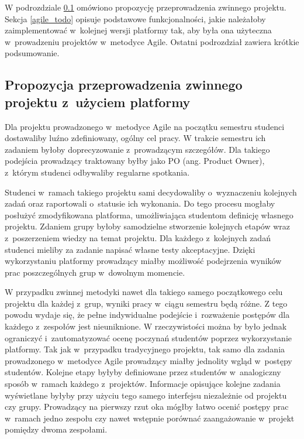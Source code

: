 W podrozdziale \ref{agile_proposition} omówiono propozycję przeprowadzenia zwinnego projektu.
Sekcja \ref{agile_todo} opisuje podstawowe funkcjonalności, jakie należałoby zaimplementować w~kolejnej wersji platformy tak, aby była ona użyteczna w~prowadzeniu projektów w~metodyce Agile.
Ostatni podrozdział zawiera krótkie podsumowanie.

\subsection{Propozycja przeprowadzenia zwinnego projektu z~użyciem platformy}
\label{agile_proposition}

Dla projektu prowadzonego w~metodyce Agile na początku semestru studenci dostawaliby luźno zdefiniowany, ogólny cel pracy.
W trakcie semestru ich zadaniem byłoby doprecyzowanie z~prowadzącym szczegółów.
Dla takiego podejścia prowadzący traktowany byłby jako PO (ang. Product Owner), z~którym studenci odbywaliby regularne spotkania.

Studenci w~ramach takiego projektu sami decydowaliby o~wyznaczeniu kolejnych zadań oraz raportowali o~statusie ich wykonania.
Do tego procesu mogłaby posłużyć zmodyfikowana platforma, umożliwiająca studentom definicję własnego projektu.
Zdaniem grupy byłoby samodzielne stworzenie kolejnych etapów wraz z~poszerzeniem wiedzy na temat projektu.
Dla każdego z~kolejnych zadań studenci mieliby za zadanie napisać własne testy akceptacyjne.
Dzięki wykorzystaniu platformy prowadzący miałby możliwość podejrzenia wyników prac poszczególnych grup w~dowolnym momencie.

W przypadku zwinnej metodyki nawet dla takiego samego początkowego celu projektu dla każdej z~grup, wyniki pracy w~ciągu semestru będą różne.
Z tego powodu wydaje się, że pełne indywidualne podejście i~rozważenie postępów dla każdego z~zespołów jest nieuniknione.
W rzeczywistości można by było jednak ograniczyć i~zautomatyzować ocenę poczynań studentów poprzez wykorzystanie platformy.
Tak jak w~przypadku tradycyjnego projektu, tak samo dla zadania prowadzonego w~metodyce Agile prowadzący miałby jednolity wgląd w~postępy studentów.
Kolejne etapy byłyby definiowane przez studentów w~analogiczny sposób w~ramach każdego z~projektów.
Informacje opisujące kolejne zadania wyświetlane byłyby przy użyciu tego samego interfejsu niezależnie od projektu czy grupy.
Prowadzący na pierwszy rzut oka mógłby łatwo ocenić postępy prac w~ramach jedno zespołu czy nawet wstępnie porównać zaangażowanie w~projekt pomiędzy dwoma zespołami.


